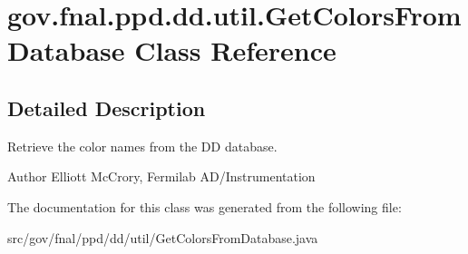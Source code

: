 \hypertarget{classgov_1_1fnal_1_1ppd_1_1dd_1_1util_1_1GetColorsFromDatabase}{\section{gov.\-fnal.\-ppd.\-dd.\-util.\-Get\-Colors\-From\-Database Class Reference}
\label{classgov_1_1fnal_1_1ppd_1_1dd_1_1util_1_1GetColorsFromDatabase}
}


\subsection{Detailed Description}
Retrieve the color names from the D\-D database.

\begin{DoxyAuthor}{Author}
Elliott Mc\-Crory, Fermilab A\-D/\-Instrumentation 
\end{DoxyAuthor}


The documentation for this class was generated from the following file\-:\begin{DoxyCompactItemize}
\item 
src/gov/fnal/ppd/dd/util/Get\-Colors\-From\-Database.\-java\end{DoxyCompactItemize}
